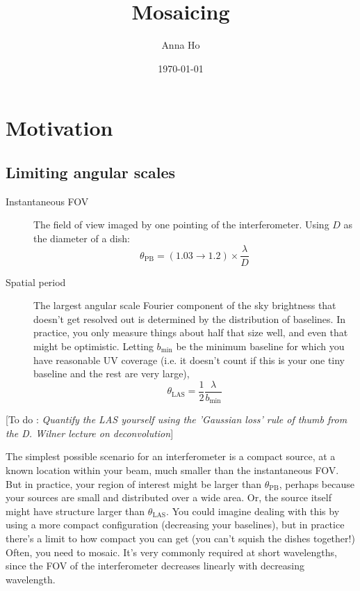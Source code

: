 \documentclass[a4paper]{article}
\title{Mosaicing}
\author{Anna Ho}
\date{\today}
\newcommand{\Comment}[2]{ [{\color{red}\sc #1 :} {{\color{cyan} \it #2}}]}
\begin{document}
\maketitle

\section{Motivation}

\subsection{Limiting angular scales}

\begin{description}
\item[Instantaneous FOV] The field of view imaged by one pointing of the interferometer. Using $D$ as the diameter of a dish:
\begin{equation}
\theta_\mathrm{PB} = (1.03 \rightarrow 1.2) \times \frac{\lambda}{D}
\end{equation}
\item[Spatial period] The largest angular scale Fourier component of the sky brightness that doesn't get resolved out is determined by the distribution of baselines. In practice, you only measure things about half that size well, and even that might be optimistic. Letting $b_\mathrm{min}$ be the minimum baseline for which you have reasonable UV coverage (i.e. it doesn't count if this is your one tiny baseline and the rest are very large),
\begin{equation}
\theta_\mathrm{LAS} = \frac{1}{2} \frac{\lambda}{b_\mathrm{min}}
\end{equation}
\end{description}

\Comment{To do}{Quantify the LAS yourself using the 'Gaussian loss' rule of thumb from the D. Wilner lecture on deconvolution}

The simplest possible scenario for an interferometer is a compact source, at a known location within your beam, much smaller than the instantaneous FOV. But in practice, your region of interest might be larger than $\theta_\mathrm{PB}$, perhaps because your sources are small and distributed over a wide area. Or, the source itself might have structure larger than $\theta_\mathrm{LAS}$. You could imagine dealing with this by using a more compact configuration (decreasing your baselines), but in practice there's a limit to how compact you can get (you can't squish the dishes together!) Often, you need to mosaic. It's very commonly required at short wavelengths, since the FOV of the interferometer decreases linearly with decreasing wavelength. 
\end{document}

